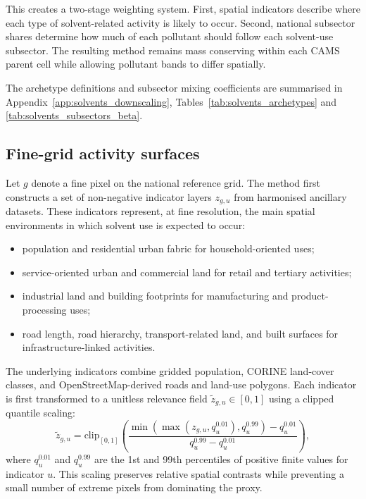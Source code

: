 This creates a two-stage weighting system. First, spatial indicators
describe where each type of solvent-related activity is likely to occur.
Second, national subsector shares determine how much of each pollutant
should follow each solvent-use subsector. The resulting method remains
mass conserving within each CAMS parent cell while allowing pollutant
bands to differ spatially.

The archetype definitions and subsector mixing coefficients are
summarised in Appendix~\ref{app:solvents_downscaling},
Tables~\ref{tab:solvents_archetypes} and
\ref{tab:solvents_subsectors_beta}.

\subsection{Fine-grid activity surfaces}

Let $g$ denote a fine pixel on the national reference grid. The method
first constructs a set of non-negative indicator layers $z_{g,u}$ from
harmonised ancillary datasets. These indicators represent, at fine
resolution, the main spatial environments in which solvent use is
expected to occur:
\begin{itemize}
  \item population and residential urban fabric for household-oriented
        uses;
  \item service-oriented urban and commercial land for retail and
        tertiary activities;
  \item industrial land and building footprints for manufacturing and
        product-processing uses;
  \item road length, road hierarchy, transport-related land, and built
        surfaces for infrastructure-linked activities.
\end{itemize}

The underlying indicators combine gridded population, CORINE land-cover
classes, and OpenStreetMap-derived roads and land-use polygons. Each
indicator is first transformed to a unitless relevance field
$\tilde{z}_{g,u} \in [0,1]$ using a clipped quantile scaling:
\begin{equation}
  \tilde{z}_{g,u} =
  \mathrm{clip}_{[0,1]}
  \left(
    \frac{
      \min\!\left(\max(z_{g,u}, q_u^{0.01}), q_u^{0.99}\right) - q_u^{0.01}
    }{
      q_u^{0.99} - q_u^{0.01}
    }
  \right),
\end{equation}
where $q_u^{0.01}$ and $q_u^{0.99}$ are the 1st and 99th percentiles of
positive finite values for indicator $u$. This scaling preserves
relative spatial contrasts while preventing a small number of extreme
pixels from dominating the proxy.

